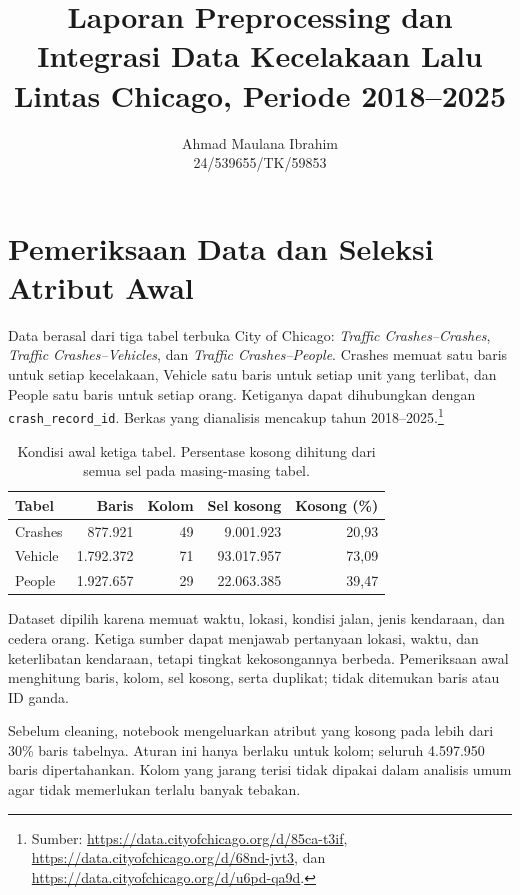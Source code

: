 \documentclass[10pt,a4paper]{article}
\title{Laporan Preprocessing dan Integrasi Data Kecelakaan Lalu Lintas Chicago, Periode 2018--2025}
\author{Ahmad Maulana Ibrahim\\24/539655/TK/59853}
\date{}
\begin{document}
\maketitle
\vspace{-1.2em}

\section{Pemeriksaan Data dan Seleksi Atribut Awal}

Data berasal dari tiga tabel terbuka City of Chicago: \emph{Traffic Crashes--Crashes},
\emph{Traffic Crashes--Vehicles}, dan \emph{Traffic Crashes--People}. Crashes
memuat satu baris untuk setiap kecelakaan, Vehicle satu baris untuk setiap unit
yang terlibat, dan People satu baris untuk setiap orang. Ketiganya dapat
dihubungkan dengan \texttt{crash\_record\_id}. Berkas yang dianalisis mencakup
tahun 2018--2025.\footnote{Sumber: \url{https://data.cityofchicago.org/d/85ca-t3if},
\url{https://data.cityofchicago.org/d/68nd-jvt3}, dan
\url{https://data.cityofchicago.org/d/u6pd-qa9d}.}

\begin{table}[H]
\centering\small
\caption{Kondisi awal ketiga tabel. Persentase kosong dihitung dari semua sel pada masing-masing tabel.}
\begin{tabular}{lrrrr}
\toprule
Tabel & Baris & Kolom & Sel kosong & Kosong (\%)\\
\midrule
Crashes & 877.921 & 49 & 9.001.923 & 20,93\\
Vehicle & 1.792.372 & 71 & 93.017.957 & 73,09\\
People & 1.927.657 & 29 & 22.063.385 & 39,47\\
\bottomrule
\end{tabular}
\end{table}

Dataset dipilih karena memuat waktu, lokasi, kondisi jalan, jenis kendaraan,
dan cedera orang. Ketiga sumber dapat menjawab pertanyaan lokasi, waktu, dan
keterlibatan kendaraan, tetapi tingkat kekosongannya berbeda. Pemeriksaan
awal menghitung baris, kolom, sel kosong, serta duplikat; tidak ditemukan
baris atau ID ganda.

Sebelum cleaning, notebook mengeluarkan atribut yang kosong pada lebih dari
30\% baris tabelnya. Aturan ini hanya berlaku untuk kolom; seluruh
4.597.950 baris dipertahankan. Kolom yang jarang terisi tidak dipakai dalam
analisis umum agar tidak memerlukan terlalu banyak tebakan.
\end{document}
